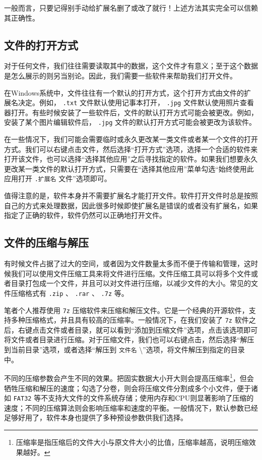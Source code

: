 一般而言，只要记得别手动给扩展名删了或改了就行！上述方法其实完全可以信赖其正确性。

\subsection{文件的打开方式}

对于任何文件，我们往往需要读取其中的数据，这个文件才有意义；至于这个数据是怎么展示的则另当别论。因此，我们需要一些软件来帮助我们打开文件。

在Windows系统中，文件往往有一个默认的打开方式，这个打开方式由文件的扩展名决定。例如， \texttt{.txt} 文件默认使用记事本打开， \texttt{.jpg} 文件默认使用照片查看器打开。有些时候安装了一些软件后，文件的默认打开方式可能会被更改。例如，安装了某个图片编辑软件后， \texttt{.jpg} 文件的默认打开方式可能会被更改为该软件。

在一些情况下，我们可能会需要临时或永久更改某一类文件或者某一个文件的打开方式。我们可以右键点击文件，然后选择“打开方式”选项，选择一个合适的软件来打开该文件，也可以选择“选择其他应用”之后寻找指定的软件。如果我们想要永久更改某一类文件的默认打开方式，只需要在“选择其他应用”菜单勾选“始终使用此应用打开 \texttt{.扩展名} 文件”选项即可。

值得注意的是，软件本身并不需要扩展名才能打开文件。软件打开文件时总是按照自己的方式来处理数据，因此很多时候即使扩展名是错误的或者没有扩展名，如果指定了正确的软件，软件仍然可以正确地打开文件。

\subsection{文件的压缩与解压}

有时候文件占据了过大的空间，或者因为文件数量太多而不便于传输和管理，这时候我们可以使用文件压缩工具来将文件进行压缩。文件压缩工具可以将多个文件或者目录打包成一个文件，并且可以对文件进行压缩，以减少文件的大小。常见的文件压缩格式有 \texttt{.zip} 、 \texttt{.rar} 、 \texttt{.7z} 等。

笔者个人推荐使用 \texttt{7z} 压缩软件来压缩和解压文件。它是一个经典的开源软件，支持多种压缩格式，并且具有较高的压缩率。一般情况下，在我们安装了 \texttt{7z} 软件之后，右键点击文件或者目录，就可以看到“添加到压缩文件”选项，点击该选项即可将文件或者目录进行压缩。对于压缩文件，我们也可以右键点击，然后选择“解压到当前目录”选项，或者选择“解压到 \texttt{文件名} \textbackslash”选项，将文件解压到指定的目录中。

不同的压缩参数会产生不同的效果。把固实数据大小开大则会提高压缩率\footnote{压缩率是指压缩后的文件大小与原文件大小的比值，压缩率越高，说明压缩效果越好。}，但会牺牲压缩和解压的速度；勾选了分卷，则会将压缩文件分割成多个小文件，便于诸如 \texttt{FAT32} 等不支持大文件的文件系统存储；使用内存和CPU则显著影响了压缩的速度；不同的压缩算法则会影响压缩率和速度的平衡。一般情况下，默认参数已经足够好用了，软件本身也提供了多种预设参数供我们选择。

